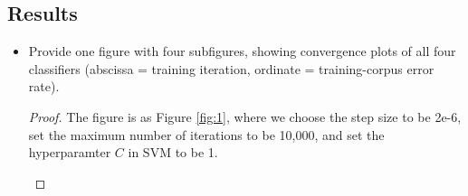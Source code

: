 \documentclass[11pt]{article}
\newcommand{\1}{\mathbf{1}}
\begin{document}
\subsection{Results}
\begin{itemize}
  \item Provide one figure with four subfigures, showing convergence plots of all four classifiers (abscissa = training iteration, ordinate = training-corpus error rate).
  \begin{proof}
    The figure is as Figure \ref{fig:1}, where we choose the step size to be 2e-6, set the maximum number of iterations to be 10,000, and set the hyperparamter $C$ in SVM to be 1.
    \begin{figure}[htbp]
    \begin{center}
\end{center}
\end{figure}
\end{proof}
\end{itemize}
\end{document}
